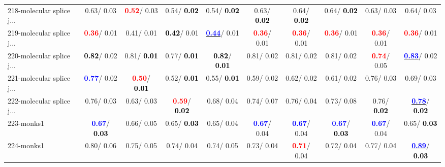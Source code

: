 \begin{table}[h]
\begin{center}
{\begin{tabular}{lc|c|c|c|c|c|c|c|c}
218-molecular splice j... &   0.63/  0.03 & \textcolor{red}{\textbf{  0.52}}/  0.03 &   0.54/\textcolor{black}{\textbf{  0.02}} &   0.54/\textcolor{black}{\textbf{  0.02}} &   0.63/\textcolor{black}{\textbf{  0.02}} &   0.64/\textcolor{black}{\textbf{  0.02}} &   0.64/\textcolor{black}{\textbf{  0.02}} &   0.63/  0.03 &   0.64/  0.03 \\
219-molecular splice j... & \textcolor{red}{\textbf{  0.36}}/  0.01 &   0.41/  0.01 & \textcolor{black}{\textbf{  0.42}}/  0.01 & \underline{\textcolor{blue}{\textbf{  0.44}}}/  0.01 & \textcolor{red}{\textbf{  0.36}}/  0.01 & \textcolor{red}{\textbf{  0.36}}/  0.01 & \textcolor{red}{\textbf{  0.36}}/  0.01 & \textcolor{red}{\textbf{  0.36}}/  0.01 & \textcolor{red}{\textbf{  0.36}}/  0.01 \\
220-molecular splice j... & \textcolor{black}{\textbf{  0.82}}/  0.02 &   0.81/\textcolor{black}{\textbf{  0.01}} &   0.77/\textcolor{black}{\textbf{  0.01}} & \textcolor{black}{\textbf{  0.82}}/\textcolor{black}{\textbf{  0.01}} &   0.81/  0.02 &   0.81/  0.02 &   0.81/  0.02 & \textcolor{red}{\textbf{  0.74}}/  0.05 & \underline{\textcolor{blue}{\textbf{  0.83}}}/  0.02 \\ \hline
221-molecular splice j... & \textcolor{blue}{\textbf{  0.77}}/  0.02 & \textcolor{red}{\textbf{  0.50}}/\textcolor{black}{\textbf{  0.01}} &   0.52/\textcolor{black}{\textbf{  0.01}} &   0.55/\textcolor{black}{\textbf{  0.01}} &   0.59/  0.02 &   0.62/  0.02 &   0.61/  0.02 &   0.76/  0.03 &   0.69/  0.03 \\
222-molecular splice j... &   0.76/  0.03 &   0.63/  0.03 & \textcolor{red}{\textbf{  0.59}}/\textcolor{black}{\textbf{  0.02}} &   0.68/  0.04 &   0.74/  0.07 &   0.76/  0.04 &   0.73/  0.08 &   0.76/\textcolor{black}{\textbf{  0.02}} & \underline{\textcolor{blue}{\textbf{  0.78}}}/\textcolor{black}{\textbf{  0.02}} \\
223-monks1 & \textcolor{blue}{\textbf{  0.67}}/\textcolor{black}{\textbf{  0.03}} &   0.66/  0.05 &   0.65/\textcolor{black}{\textbf{  0.03}} &   0.65/  0.04 & \textcolor{blue}{\textbf{  0.67}}/  0.04 & \textcolor{blue}{\textbf{  0.67}}/  0.04 & \textcolor{blue}{\textbf{  0.67}}/\textcolor{black}{\textbf{  0.03}} & \textcolor{blue}{\textbf{  0.67}}/  0.04 &   0.65/\textcolor{black}{\textbf{  0.03}} \\
224-monks1 &   0.80/  0.06 &   0.75/  0.05 &   0.74/  0.04 &   0.74/  0.05 &   0.73/  0.04 & \textcolor{red}{\textbf{  0.71}}/  0.04 &   0.72/  0.04 &   0.77/  0.04 & \underline{\textcolor{blue}{\textbf{  0.89}}}/\textcolor{black}{\textbf{  0.03}} \\\end{tabular}}\label{stratsALCKappa6Allallb}
\end{center}
\end{table}
